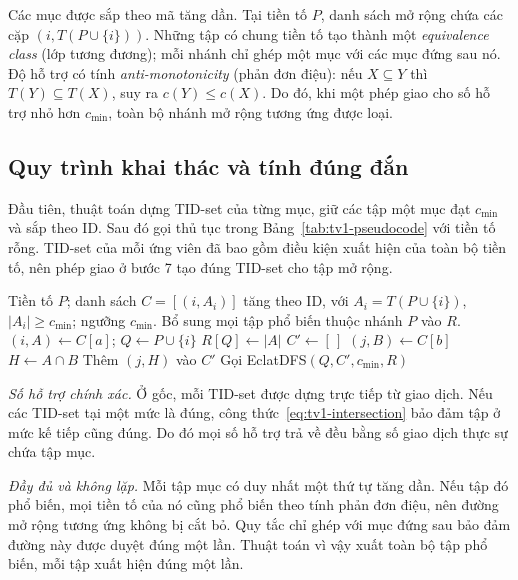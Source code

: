 Các mục được sắp theo mã tăng dần. Tại tiền tố $P$, danh sách mở rộng chứa các cặp $(i,T(P\cup\{i\}))$. Những tập có chung tiền tố tạo thành một \emph{equivalence class} (lớp tương đương); mỗi nhánh chỉ ghép một mục với các mục đứng sau nó. Độ hỗ trợ có tính \emph{anti-monotonicity} (phản đơn điệu): nếu $X\subseteq Y$ thì $T(Y)\subseteq T(X)$, suy ra $c(Y)\le c(X)$. Do đó, khi một phép giao cho số hỗ trợ nhỏ hơn $c_{\min}$, toàn bộ nhánh mở rộng tương ứng được loại.

\subsection{Quy trình khai thác và tính đúng đắn}
Đầu tiên, thuật toán dựng TID-set của từng mục, giữ các tập một mục đạt $c_{\min}$ và sắp theo ID. Sau đó gọi thủ tục trong Bảng~\ref{tab:tv1-pseudocode} với tiền tố rỗng. TID-set của mỗi ứng viên đã bao gồm điều kiện xuất hiện của toàn bộ tiền tố, nên phép giao ở bước 7 tạo đúng TID-set cho tập mở rộng.

\begin{table}[t]
\caption{Giả mã DFS dùng chung cho hai phiên bản Eclat.}
\label{tab:tv1-pseudocode}
\begin{minipage}{\columnwidth}
\small
\begin{algorithmic}[1]
\REQUIRE Tiền tố $P$; danh sách $C=[(i,A_i)]$ tăng theo ID, với $A_i=T(P\cup\{i\})$, $|A_i|\ge c_{\min}$; ngưỡng $c_{\min}$.
\ENSURE Bổ sung mọi tập phổ biến thuộc nhánh $P$ vào $R$.
  \STATE $(i,A)\gets C[a]$; $Q\gets P\cup\{i\}$
  \STATE $R[Q]\gets |A|$
  \STATE $C'\gets [\,]$
    \STATE $(j,B)\gets C[b]$
    \STATE $H\gets A\cap B$
      \STATE Thêm $(j,H)$ vào $C'$
    \ENDIF
  \ENDFOR
    \STATE Gọi EclatDFS$(Q,C',c_{\min},R)$
  \ENDIF
\ENDFOR
\end{algorithmic}
\end{minipage}
\end{table}

\textit{Số hỗ trợ chính xác.} Ở gốc, mỗi TID-set được dựng trực tiếp từ giao dịch. Nếu các TID-set tại một mức là đúng, công thức~\eqref{eq:tv1-intersection} bảo đảm tập ở mức kế tiếp cũng đúng. Do đó mọi số hỗ trợ trả về đều bằng số giao dịch thực sự chứa tập mục.

\textit{Đầy đủ và không lặp.} Mỗi tập mục có duy nhất một thứ tự tăng dần. Nếu tập đó phổ biến, mọi tiền tố của nó cũng phổ biến theo tính phản đơn điệu, nên đường mở rộng tương ứng không bị cắt bỏ. Quy tắc chỉ ghép với mục đứng sau bảo đảm đường này được duyệt đúng một lần. Thuật toán vì vậy xuất toàn bộ tập phổ biến, mỗi tập xuất hiện đúng một lần.

